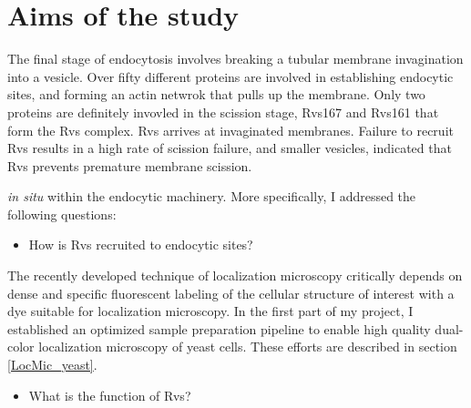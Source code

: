 
\chapter{Aims of the study} %

\label{Ch:Aims} %

The final stage of endocytosis involves breaking a tubular membrane invagination into a vesicle. Over fifty different proteins are involved in establishing endocytic sites, and forming an actin netwrok that pulls up the membrane. Only two proteins are  definitely invovled in the scission stage, Rvs167 and Rvs161 that form the Rvs complex. Rvs arrives at invaginated membranes. Failure to recruit Rvs results in a high rate of scission failure, and smaller vesicles, indicated that Rvs prevents premature membrane scission. 

 \textit{in situ} within the endocytic machinery. More specifically, I addressed the following questions:

\begin{itemize}
	\item How is Rvs recruited to endocytic sites? 
\end{itemize}

The recently developed technique of localization microscopy critically depends on dense and specific fluorescent labeling of the cellular structure of interest with a dye suitable for localization microscopy. In the first part of my project, I established an optimized sample preparation pipeline to enable high quality dual-color localization microscopy of yeast cells. These efforts are described in section \ref{LocMic_yeast}.

\begin{itemize}
	\item What is the function of Rvs?
\end{itemize}